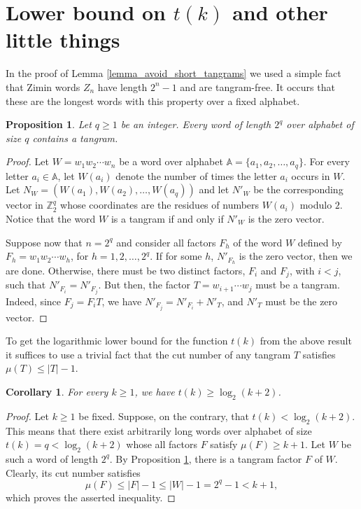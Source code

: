 \documentclass[12pt]{amsart}
\theoremstyle{plain}
\newtheorem{corollary}{Corollary}
\newtheorem{proposition}{Proposition}
\numberwithin{equation}{section}
\begin{document}
\section{Lower bound on $t(k)$ and other little things}\label{Section Lower}
In the proof of Lemma \ref{lemma_avoid_short_tangrams} we used a simple fact that Zimin words $Z_n$ have length $2^n-1$ and are tangram-free. It occurs that these are the longest words with this property over a fixed alphabet.

\begin{proposition}\label{Proposition Tangram q}
Let $q\geqslant 1$ be an integer. Every word of length $2^q$ over alphabet of size $q$ contains a tangram.
\end{proposition}
\begin{proof}
Let $W=w_1w_2\cdots w_n$ be a word over alphabet $\mathbb{A}=\{a_1,a_2,\ldots,a_q\}$. For every letter $a_i\in \mathbb{A}$, let $W(a_i)$ denote the number of times the letter $a_i$ occurs in $W$. Let $N_W=(W(a_1),W(a_2),\ldots, W(a_q))$ and let $N'_W$ be the corresponding vector in $\mathbb{Z}_2^q$ whose coordinates are the residues of numbers $W(a_i)$ modulo $2$. Notice that the word $W$ is a tangram if and only if $N'_W$ is the zero vector.

Suppose now that $n=2^q$ and consider all factors $F_h$ of the word $W$ defined by $F_h=w_1w_2\cdots w_h$, for $h=1,2,\ldots, 2^q$. If for some $h$, $N'_{F_h}$ is the zero vector, then we are done. Otherwise, there must be two distinct factors, $F_i$ and $F_j$, with $i<j$, such that $N'_{F_i}=N'_{F_j}$. But then, the factor $T=w_{i+1}\cdots w_j$ must be a tangram. Indeed, since $F_j=F_iT$, we have $N'_{F_j}=N'_{F_i}+N'_T$, and $N'_T$ must be the zero vector.
\end{proof}

To get the logarithmic lower bound for the function $t(k)$ from the above result it suffices to use a trivial fact that the cut number of any tangram $T$ satisfies $\mu(T)\leqslant |T|-1$.

\begin{corollary}\label{Corollary Lower Bound}
For every $k\geqslant 1$, we have $t(k)\geqslant \log_2(k+2)$.
\end{corollary}
\begin{proof}
Let $k\geqslant 1$ be fixed. Suppose, on the contrary, that $t(k)<\log_2(k+2)$. This means that there exist arbitrarily long words over alphabet of size $t(k)=q<\log_2(k+2)$ whose all factors $F$ satisfy $\mu(F)\geqslant k+1$. Let $W$ be such a word of length $2^q$. By Proposition \ref{Proposition Tangram q}, there is a tangram factor $F$ of $W$. Clearly, its cut number satisfies $$\mu(F)\leqslant |F|-1\leqslant |W|-1=2^q-1<k+1,$$
which proves the asserted inequality.
\end{proof}
\end{document}
